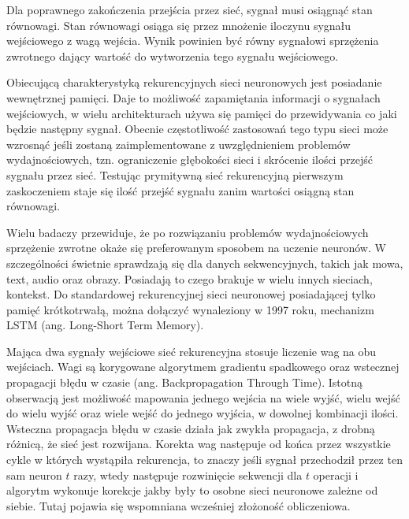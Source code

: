 \documentclass[12pt,a4paper,twoside,titlepage,openright]{book}
\begin{document}
Dla poprawnego zakończenia przejścia przez sieć, sygnał musi osiągnąć stan równowagi. Stan równowagi osiąga się przez mnożenie iloczynu sygnału wejściowego z wagą wejścia. Wynik powinien być równy sygnałowi sprzężenia zwrotnego dający wartość do wytworzenia tego sygnału wejściowego.

Obiecującą charakterystyką rekurencyjnych sieci neuronowych jest posiadanie wewnętrznej pamięci. Daje to możliwość zapamiętania informacji o sygnałach wejściowych, w wielu architekturach używa się pamięci do przewidywania co jaki będzie następny sygnał. Obecnie częstotliwość zastosowań tego typu sieci może wzrosnąć jeśli zostaną zaimplementowane z uwzględnieniem problemów wydajnościowych, tzn. ograniczenie głębokości sieci i skrócenie ilości przejść sygnału przez sieć. Testując prymitywną sieć rekurencyjną pierwszym zaskoczeniem staje się ilość przejść sygnału zanim wartości osiągną stan równowagi.

Wielu badaczy \cite{siteRNN} przewiduje,  że po rozwiązaniu problemów wydajnościowych sprzężenie zwrotne okaże się preferowanym sposobem na uczenie neuronów. W szczególności świetnie sprawdzają się dla danych sekwencyjnych, takich jak mowa, text, audio oraz obrazy. Posiadają to czego brakuje w wielu innych sieciach, kontekst. Do standardowej rekurencyjnej sieci neuronowej posiadającej tylko pamięć krótkotrwałą, można dołączyć wynaleziony w 1997 roku, mechanizm LSTM (ang. Long-Short Term Memory). 

Mająca dwa sygnały wejściowe sieć rekurencyjna stosuje liczenie wag na obu wejściach. Wagi są korygowane algorytmem gradientu spadkowego oraz wstecznej propagacji błędu w czasie (ang. Backpropagation Through Time). Istotną obserwacją jest możliwość mapowania jednego wejścia na wiele wyjść, wielu wejść do wielu wyjść oraz wiele wejść do jednego wyjścia, w dowolnej kombinacji ilości. Wsteczna propagacja błędu w czasie działa jak zwykła propagacja, z drobną różnicą, że sieć jest rozwijana. Korekta wag następuje od końca przez wszystkie cykle w których wystąpiła rekurencja, to znaczy jeśli sygnał przechodził przez ten sam neuron $t$ razy, wtedy następuje rozwinięcie sekwencji dla $t$ operacji i algorytm wykonuje korekcje jakby były to osobne sieci neuronowe zależne od siebie. Tutaj pojawia się wspomniana wcześniej złożoność obliczeniowa.
\end{document}
